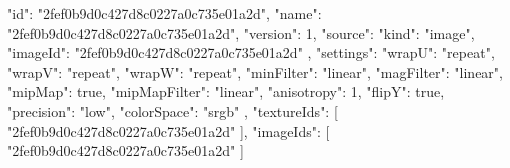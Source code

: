 {
  "id": "2fef0b9d0c427d8c0227a0c735e01a2d",
  "name": "2fef0b9d0c427d8c0227a0c735e01a2d",
  "version": 1,
  "source": {
    "kind": "image",
    "imageId": "2fef0b9d0c427d8c0227a0c735e01a2d"
  },
  "settings": {
    "wrapU": "repeat",
    "wrapV": "repeat",
    "wrapW": "repeat",
    "minFilter": "linear",
    "magFilter": "linear",
    "mipMap": true,
    "mipMapFilter": "linear",
    "anisotropy": 1,
    "flipY": true,
    "precision": "low",
    "colorSpace": "srgb"
  },
  "textureIds": [
    "2fef0b9d0c427d8c0227a0c735e01a2d"
  ],
  "imageIds": [
    "2fef0b9d0c427d8c0227a0c735e01a2d"
  ]
}
